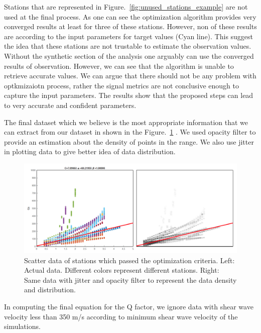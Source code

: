 Stations that are represented in Figure.~\ref{fig:unused_stations_example} are not used at the final process. As one can see the optimization algorithm provides very converged results at least for three of these stations. However, non of these results are according to the input parameters for target values (Cyan line). This suggest the idea that these stations are not trustable to estimate the observation values. Without the synthetic section of the analysis one arguably can use the converged results of observation. However, we can see that the algorithm is unable to retrieve accurate values. We can argue that there should not be any problem with optkmizaiotn process, rather the signal metrics are not conclusive enough to capture the input parameters. The  results show that the proposed steps can lead to very accurate and confident parameters. 

The final dataset which we believe is the most appropriate information that we can extract from our dataset in shown in the Figure.~\ref{fig:results_conservative_with_regression} . We used opacity filter to provide an estimation about the density of points in the range. We also use jitter in plotting data to give better idea of data distribution. 

  \begin{figure}[ht]
    \centering
    \includegraphics[width=\textwidth]{figures/pdf/results_conservative_with_regression.png}
    \caption{Scatter data of stations which passed the optimization criteria. Left: Actual data. Different colors represent different stations. Right: Same data with jitter and opacity filter to represent the data density and distribution.}
    \label{fig:results_conservative_with_regression}
\end{figure}

In computing the final equation for the Q factor, we ignore data with shear wave velocity less than 350 m/s according to minimum shear wave velocity of the simulations.  




 

